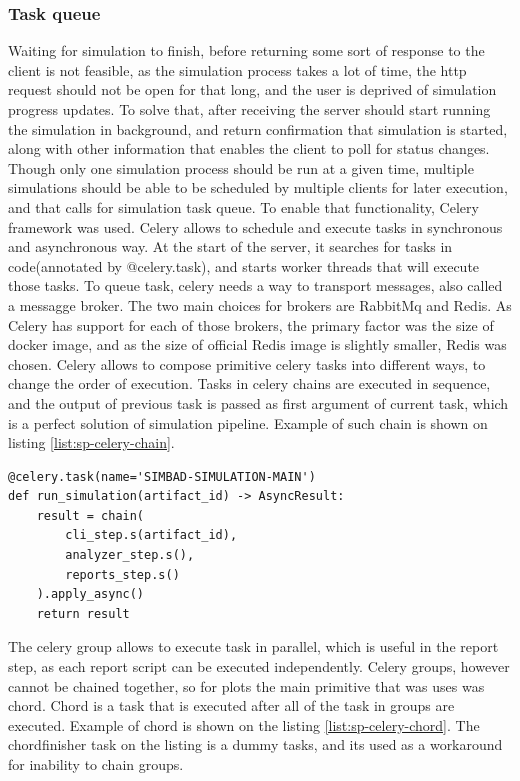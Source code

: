 \subsubsection{Task queue}
Waiting for simulation to finish, before returning some sort of response to the client is not feasible, as the simulation process takes a lot of time, the http request should not be open for that long, and the user is deprived of simulation progress updates. To solve that, after receiving the server should start running the simulation in background, and return confirmation that simulation is started, along with other information that enables the client to poll for status changes.
Though only one simulation process should be run at a given time, multiple simulations should be able to be scheduled by multiple clients for later execution, and that calls for simulation task queue. To enable that functionality, Celery framework was used. Celery allows to schedule and execute tasks in synchronous and asynchronous way. At the start of the server, it searches for tasks in code(annotated by @celery.task), and starts worker threads that will execute those tasks.
To queue task, celery needs a way to transport messages, also called a messagge broker. The two main choices for brokers are RabbitMq and Redis. As Celery has support for each of those brokers, the primary factor was the size of docker image, and as the size of official Redis image is slightly smaller, Redis was chosen.
Celery allows to compose primitive celery tasks into different ways, to change the order of execution. Tasks in celery chains are executed in sequence, and the output of previous task is passed as first argument of current task, which is a perfect solution of simulation pipeline. Example of such chain is shown on listing \ref{list:sp-celery-chain}. 
\begin{lstlisting}[label=list:sp-celery-chain,caption=Celery chain - Main Simulation task, basicstyle=\footnotesize\ttfamily]
@celery.task(name='SIMBAD-SIMULATION-MAIN')
def run_simulation(artifact_id) -> AsyncResult:
    result = chain(
        cli_step.s(artifact_id),
        analyzer_step.s(),
        reports_step.s()
    ).apply_async()
    return result
\end{lstlisting}
The celery group allows to execute task in parallel, which is useful in the report step, as each report script can be executed independently. Celery groups, however cannot be chained together, so for plots the main primitive that was uses was chord. Chord is a task that is executed after all of the task in groups are executed. Example of chord is shown on the listing \ref{list:sp-celery-chord}. The chordfinisher task on the listing is a dummy tasks, and its used as a workaround for inability to chain groups.
